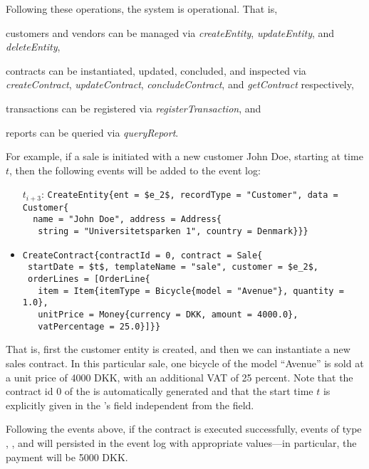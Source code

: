 Following these operations, the system is operational. That is,
\begin{inparaenum}[(i)]
  \item customers and vendors can be managed via \emph{createEntity},
    \emph{updateEntity}, and \emph{deleteEntity},
  \item contracts can be instantiated, updated, concluded, and
    inspected via \emph{createContract}, \emph{updateContract},
    \emph{concludeContract}, and \emph{getContract} respectively,
  \item transactions can be registered via \emph{registerTransaction},
    and
  \item reports can be queried via \emph{queryReport}.
\end{inparaenum}

For example, if a sale is initiated with a new customer John Doe,
starting at time $t$, then the following events will be added to the
event log:
\begin{itemize}
\item[$t_{i+3}$:] \lstinline[language=eventlog]!CreateEntity{ent = $e_2$, recordType = "Customer", data = Customer{!\\
\lstinline[language=eventlog]!  name = "John Doe", address = Address{!\\
\lstinline[language=eventlog]!   string = "Universitetsparken 1", country = Denmark}}}!
\item[$t_{i+4}$:] \lstinline[language=eventlog]!CreateContract{contractId = 0, contract = Sale{!\\
\lstinline[language=eventlog]! startDate = $t$, templateName = "sale", customer = $e_2$,!\\
\lstinline[language=eventlog]! orderLines = [OrderLine{!\\
\lstinline[language=eventlog]!   item = Item{itemType = Bicycle{model = "Avenue"}, quantity = 1.0},!\\
\lstinline[language=eventlog]!   unitPrice = Money{currency = DKK, amount = 4000.0},!\\
\lstinline[language=eventlog]!   vatPercentage = 25.0}]}}!
\end{itemize}
That is, first the customer entity is created, and then we can
instantiate a new sales contract. In this particular sale, one bicycle
of the model ``Avenue'' is sold at a unit price of 4000 DKK, with an
additional VAT of 25 percent. Note that the contract id 0 of the
 is automatically generated and that the
start time $t$ is explicitly given in the
's  field independent
from the  field.

Following the events above, if the contract is executed
successfully, events of type ,
, and  will persisted in the
event log with appropriate values---in particular, the payment will be
5000 DKK.

